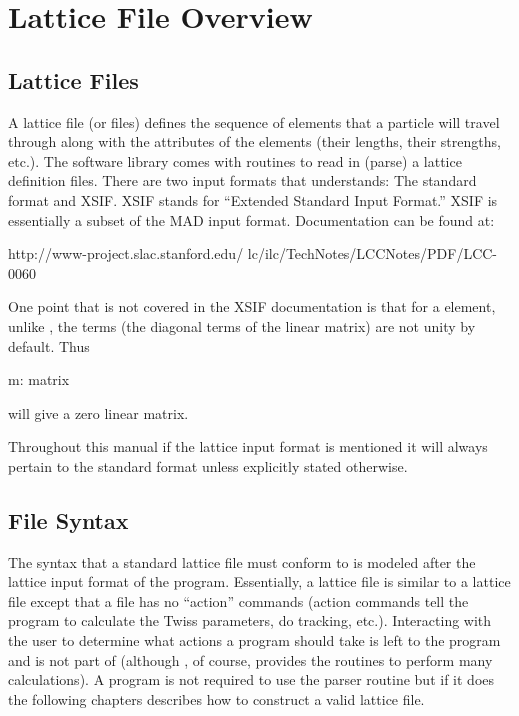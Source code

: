 \chapter{Lattice File Overview}

\section{Lattice Files}
\label{s:lattice_file_formats}

A lattice file (or files) defines the sequence of elements that a
particle will travel through along with the attributes of the elements
(their lengths, their strengths, etc.). 
The \bmad software library comes with routines to read in (parse) a
lattice definition files. There are two input formats that
\bmad understands: The \bmad standard format and
XSIF\cite{b:xsif}. XSIF stands for ``Extended Standard Input Format.''
XSIF is essentially a subset of the MAD input format. Documentation
can be found at:
\begin{example}
  http://www-project.slac.stanford.edu/
              lc/ilc/TechNotes/LCCNotes/PDF/LCC-0060%
\end{example}
One point that is not covered in the XSIF documentation is that for a
 element, unlike \MAD, the  terms (the diagonal
terms of the linear matrix) are not unity by default. Thus
\begin{example}
  m: matrix
\end{example}
will give a zero linear matrix.

Throughout this manual if the lattice input format is mentioned it
will always pertain to the \bmad standard format unless explicitly
stated otherwise.

\section{File Syntax}

The syntax that a \bmad standard lattice file must conform to is
modeled after the lattice input format of the \MAD program.
Essentially, a \bmad lattice file is similar to a \mad lattice file
except that a \bmad file has no ``action'' commands (action commands
tell the program to calculate the Twiss parameters, do tracking,
etc.).  Interacting with the user to determine what actions a program
should take is left to the program and is not part of \bmad (although
\bmad, of course, provides the routines to perform many
calculations). A program is not required to use the \bmad parser
routine but if it does the following chapters describes how to
construct a valid lattice file.

